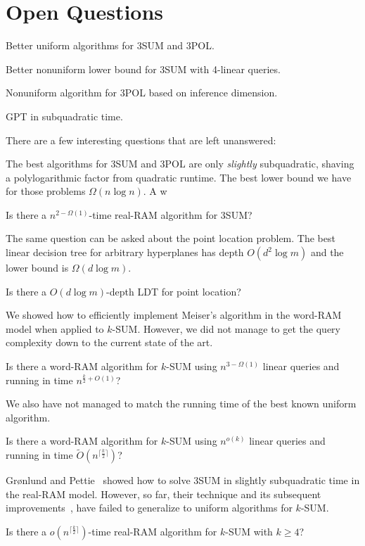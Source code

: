 \section{Open Questions}

Better uniform algorithms for 3SUM and 3POL.

Better nonuniform lower bound for 3SUM with 4-linear queries.

Nonuniform algorithm for 3POL based on inference dimension.

GPT in subquadratic time.

There are a few interesting questions that are left unanswered:

The best algorithms for 3SUM and 3POL are only \emph{slightly} subquadratic,
shaving a polylogarithmic factor from quadratic runtime. The best lower bound
we have for those problems \(\Omega(n \log n)\). A w
\begin{openquestion}
	Is there a \(n^{2-\Omega(1)}\)-time real-RAM algorithm for 3SUM?
\end{openquestion}

The same question can be asked about the point location problem. The best
linear decision tree for arbitrary hyperplanes has depth \(O(d^2 \log m)\) and
the lower bound is \(\Omega(d \log m)\).
\begin{openquestion}
Is there a \(O(d \log m)\)-depth LDT for point location?
\end{openquestion}

We showed how to efficiently implement Meiser's algorithm in the word-RAM model
when applied to \(k\)-SUM. However, we did not manage to get the query
complexity down to the current state of the art.
\begin{openquestion}
Is there a word-RAM algorithm for \(k\)-SUM using \(n^{3 - \Omega(1)}\)
linear queries and running in time \(n^{\frac{k}{2}+O(1)}\)?
\end{openquestion}

We also have not managed to match the running time of the best known uniform
algorithm.
\begin{openquestion}
Is there a word-RAM algorithm for \(k\)-SUM using \(n^{o(k)}\) linear queries and
running in time \( \tilde{O}(n^{\lceil \frac k2 \rceil})\)?
\end{openquestion}

Gr\o nlund and Pettie~\cite{GP18}
showed how to solve 3SUM in slightly subquadratic time in the real-RAM model.
However, so far, their technique and its subsequent
improvements~\cite{Fr15,GS15,Ch18}, have failed to generalize to uniform algorithms
for \(k\)-SUM.
\begin{openquestion}
	Is there a \(o(n^{\lceil \frac k2 \rceil})\)-time real-RAM algorithm for
	\(k\)-SUM with \(k \geq 4\)?
\end{openquestion}
